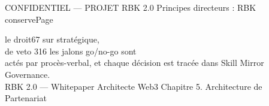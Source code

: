\vspace{0.5em}
\vspace{0.5em}
\vspace{0.5em}
\vspace{0.5em}
\begin{confidential}CONFIDENTIEL — PROJET RBK 2.0          Principes directeurs : RBK conservePage\end{confidential}
le droit67  sur stratégique,\\
de veto  316        les jalons go/no-go sont\\
actés par procès-verbal, et chaque décision est tracée dans Skill Mirror Governance.\\
RBK 2.0 — Whitepaper Architecte Web3                                                                                Chapitre 5. Architecture de Partenariat\\
\vspace{0.5em}
\vspace{0.5em}
\vspace{0.5em}
